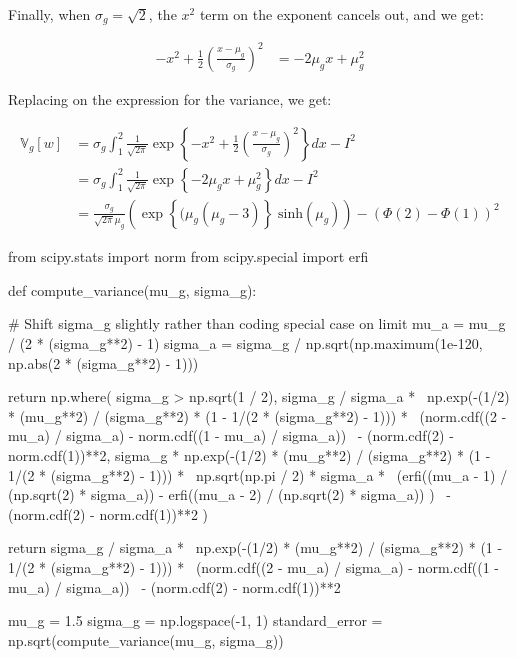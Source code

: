 Finally, when \(\sigma_g = \sqrt{2}\), the \(x^2\) term on the exponent
cancels out, and we get:

\[
\begin{align}
-x^2 + \frac{1}{2} \left(\frac{x - \mu_g}{\sigma_g}\right)^2 &= -2 \mu_g x + \mu_g^2
\end{align}
\]

Replacing on the expression for the variance, we get:

\[
\begin{align}
\mathbb{V}_g[w] &= \sigma_g \int_1^2 \frac{1}{\sqrt{2 \pi}} \exp \left\{ -x^2 +\frac{1}{2} \left(\frac{x - \mu_g}{\sigma_g}\right)^2 \right\} dx - I^2 \\
&= \sigma_g \int_1^2 \frac{1}{\sqrt{2 \pi}} \exp \left\{ -2 \mu_g x + \mu_g^2 \right\} dx - I^2 \\
&= \frac{\sigma_g }{\sqrt{2 \pi} \mu_g} \left( \exp \left\{ (\mu_g (\mu_g - 3) \right\} \; \text{sinh} (\mu_g) \right) - \left( \Phi(2) - \Phi(1) \right)^2
\end{align}
\]

\begin{python}
from scipy.stats import norm
from scipy.special import erfi

def compute_variance(mu_g, sigma_g):
    
    # Shift sigma_g slightly rather than coding special case on limit
    mu_a = mu_g / (2 * (sigma_g**2) - 1)
    sigma_a = sigma_g / np.sqrt(np.maximum(1e-120, np.abs(2 * (sigma_g**2) - 1)))
    
    return np.where(
        sigma_g > np.sqrt(1 / 2),
        sigma_g / sigma_a * \
            np.exp(-(1/2) * (mu_g**2) / (sigma_g**2) * (1 - 1/(2 * (sigma_g**2) - 1))) * \
            (norm.cdf((2 - mu_a) / sigma_a) - norm.cdf((1 - mu_a) / sigma_a)) \
            - (norm.cdf(2) - norm.cdf(1))**2,
        sigma_g * np.exp(-(1/2) * (mu_g**2) / (sigma_g**2) * (1 - 1/(2 * (sigma_g**2) - 1))) * \
            np.sqrt(np.pi / 2) * sigma_a * \
                (erfi((mu_a - 1) / (np.sqrt(2) * sigma_a)) - erfi((mu_a - 2) / (np.sqrt(2) * sigma_a)) ) \
            - (norm.cdf(2) - norm.cdf(1))**2   
    )
    
    return sigma_g / sigma_a * \
        np.exp(-(1/2) * (mu_g**2) / (sigma_g**2) * (1 - 1/(2 * (sigma_g**2) - 1))) * \
        (norm.cdf((2 - mu_a) / sigma_a) - norm.cdf((1 - mu_a) / sigma_a)) \
        - (norm.cdf(2) - norm.cdf(1))**2 
\end{python}

\begin{python}
mu_g = 1.5
sigma_g = np.logspace(-1, 1)
standard_error = np.sqrt(compute_variance(mu_g, sigma_g))
\end{python}


